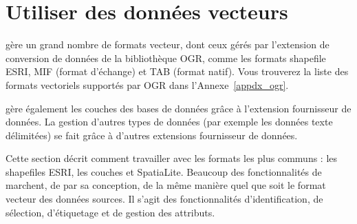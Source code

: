 \chapter{Utiliser des données vecteurs}\label{label_workingvector}



\qg gère un grand nombre de formats vecteur, dont ceux gérés par l'extension de conversion de données de la bibliothèque OGR, comme les formats shapefile ESRI, \map MIF (format d'échange) et  \map TAB (format natif).
Vous trouverez la liste des formats vectoriels supportés par OGR dans l'Annexe~\ref{appdx_ogr}.

\qg gère également les couches \pg {} des bases de données \psq grâce à l'extension \og fournisseur de données\fg \psq. La gestion d'autres types de données (par exemple les données texte délimitées) se fait grâce à d'autres extensions \og fournisseur de données\fg.

Cette section décrit comment travailler avec les formats les plus communs : les shapefiles ESRI, les couches \pg et SpatiaLite. Beaucoup des fonctionnalités de \qg marchent, de par sa conception, de la même manière quel que soit le format vecteur des données sources. Il s'agit des fonctionnalités d'identification, de sélection, d'étiquetage et de gestion des attributs.


